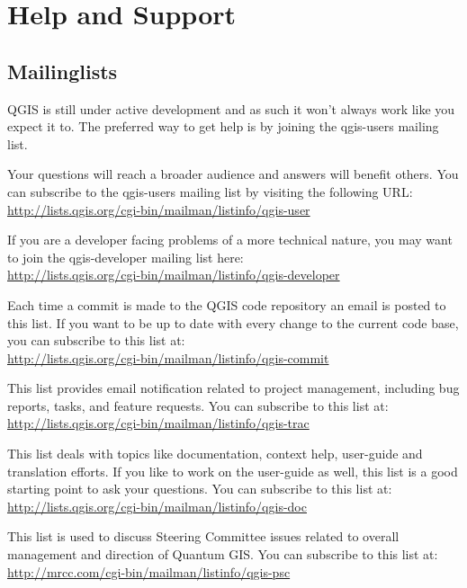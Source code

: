 \section{Help and Support}\label{label_helpsupport}

\subsection{Mailinglists}
QGIS is still under active development and as such it won't always work like
you expect it to. The preferred way to get help is by joining the qgis-users
mailing list. 

Your questions will reach a broader audience and answers will
benefit others. You can subscribe to the qgis-users mailing list by visiting
the following URL: \\
\url{http://lists.qgis.org/cgi-bin/mailman/listinfo/qgis-user}

If you are a developer facing problems of a more technical nature, you may
want to join the qgis-developer mailing list here:\\
\url{http://lists.qgis.org/cgi-bin/mailman/listinfo/qgis-developer}

Each time a commit is made to the QGIS code repository an email is posted to this list. If you want to be up to date with every change to the current code base, you can subscribe to this list at:\\
\url{http://lists.qgis.org/cgi-bin/mailman/listinfo/qgis-commit}

This list provides email notification related to project management, including bug reports, tasks, and feature requests. You can subscribe to this list at:\\
\url{http://lists.qgis.org/cgi-bin/mailman/listinfo/qgis-trac}

This list deals with topics like documentation, context help, user-guide and translation efforts. If you like to work on the user-guide as well, this list is a good starting point
to ask your questions.
You can subscribe to this list at:\\
\url{http://lists.qgis.org/cgi-bin/mailman/listinfo/qgis-doc}

This list is used to discuss Steering Committee issues related to overall management and direction of Quantum GIS. You can subscribe to this list at:\\
\url{http://mrcc.com/cgi-bin/mailman/listinfo/qgis-psc}

